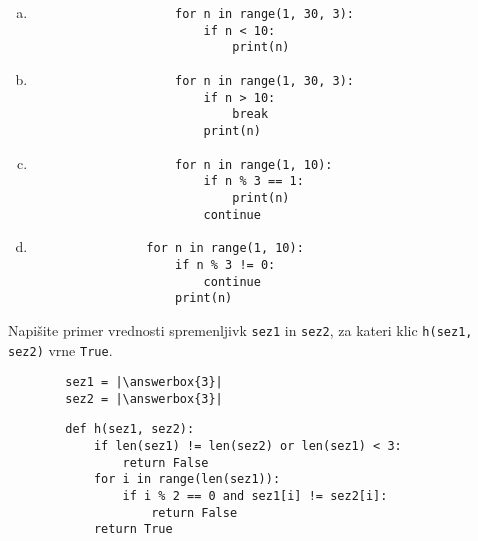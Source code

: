 \documentclass[arhiv, 10pt]{../izpit}
\newcommand{\inlinepy}[1]{\texttt{#1}}
\newcommand{\answerbox}[1]{\framebox{\vphantom{\large M}\hspace{#1cm}}}
\begin{document}
        \begin{multicols}{2}
        \begin{enumerate}[(a)]
\item 
                \begin{verbatim}
                    for n in range(1, 30, 3):
                        if n < 10:
                            print(n)
                \end{verbatim}
            
\item 
                \begin{verbatim}
                    for n in range(1, 30, 3):
                        if n > 10:
                            break
                        print(n)
                \end{verbatim}
            
\item 
                \begin{verbatim}
                    for n in range(1, 10):
                        if n % 3 == 1:
                            print(n)
                        continue
                \end{verbatim}
            
\item 
            \begin{verbatim}
                for n in range(1, 10):
                    if n % 3 != 0:
                        continue
                    print(n)
            \end{verbatim}
        
\end{enumerate}

        \end{multicols}
    
        \naloga*
        \begin{multicols}{2}
        \noindent
        Napišite primer vrednosti spremenljivk \inlinepy{sez1} in \inlinepy{sez2}, za kateri klic \inlinepy{h(sez1, sez2)} vrne \inlinepy{True}.
        \begin{verbatim}
        sez1 = |\answerbox{3}|
        sez2 = |\answerbox{3}|
        \end{verbatim}
        \vfil
        \columnbreak
        \begin{verbatim}
        def h(sez1, sez2):
            if len(sez1) != len(sez2) or len(sez1) < 3:
                return False
            for i in range(len(sez1)):
                if i % 2 == 0 and sez1[i] != sez2[i]:
                    return False
            return True
        \end{verbatim}
        \end{multicols}
    
\end{document}
